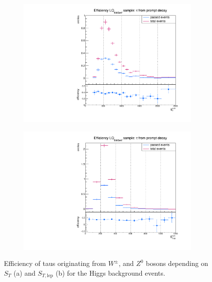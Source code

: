 \begin{figure}
  \centering
                \begin{subfigure}[t]{0.49\textwidth}
                \includegraphics[width=\textwidth]{figures/plots/ttH/Divided_promptST.pdf}
                \label{Divided:prompt:ST}
                \end{subfigure}
                \begin{subfigure}[t]{0.49\textwidth}
                \includegraphics[width=\textwidth]{figures/plots/ttH/Divided_promptSTlep.pdf}
                \label{Divided:prompt:STlep}
\end{subfigure}
\caption[Efficiency of taus originating from $W^\pm$, and $Z^0$ bosons for the Higgs background events.]{Efficiency of taus originating from $W^\pm$, and $Z^0$ bosons depending on $S_{T}$ (a) and $S_{T,\text{lep}}$ (b) for the Higgs background events.}
\label{Divided:prompt:STgedöns}
\end{figure}
